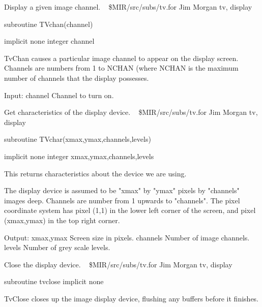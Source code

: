 %
\noindent Display a given image channel.
\newline \ 
\newline {} \$MIR/src/subs/tv.for
\newline {} Jim Morgan
\newline {} tv, display
\par{\tenpoint
{\eightpoint\begintt
        subroutine TVchan(channel)

        implicit none
        integer channel

  TvChan causes a particular image channel to appear on the display
  screen. Channels are numbers from 1 to NCHAN (where NCHAN is the
  maximum number of channels that the display possesses.

  Input:
    channel    Channel to turn on.
\endtt}
\par}
%
\noindent Get characteristics of the display device.
\newline \ 
\newline {} \$MIR/src/subs/tv.for
\newline {} Jim Morgan
\newline \abox{Keywords:} tv, display
\par{\tenpoint
{\eightpoint\begintt
        subroutine TVchar(xmax,ymax,channels,levels)

        implicit none
        integer xmax,ymax,channels,levels

  This returns characteristics about the device we are using.

  The display device is assumed to be "xmax" by "ymax" pixels by
  "channels" images deep. Channels are number from 1 upwards to "channels".
  The pixel coordinate system has pixel (1,1) in the lower left corner
  of the screen, and pixel (xmax,ymax) in the top right corner.

  Output:
    xmax,ymax  Screen size in pixels.
    channels   Number of image channels.
    levels     Number of grey scale levels.
\endtt}
\par}
%
\noindent Close the display device.
\newline \ 
\newline {} \$MIR/src/subs/tv.for
\newline \abox{Responsible:} Jim Morgan
\newline {} tv, display
\par{\tenpoint
{\eightpoint\begintt
        subroutine tvclose
        implicit none

  TvClose closes up the image display device, flushing any buffers before
  it finishes.
\endtt}
\par}
